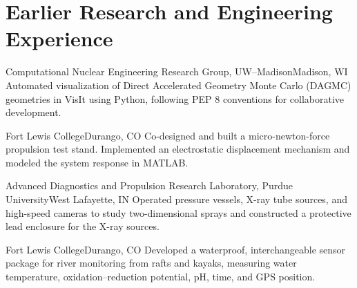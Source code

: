 \section{Earlier Research and Engineering Experience}
    {Computational Nuclear Engineering Research Group, UW--Madison}{Madison, WI}
Automated visualization of Direct Accelerated Geometry Monte Carlo (DAGMC) geometries in VisIt
using Python, following PEP 8 conventions for collaborative development.

    {Fort Lewis College}{Durango, CO}
Co-designed and built a micro-newton-force propulsion test stand. Implemented an electrostatic
displacement mechanism and modeled the system response in MATLAB.

    {Advanced Diagnostics and Propulsion Research Laboratory, Purdue University}{West Lafayette, IN}
Operated pressure vessels, X-ray tube sources, and high-speed cameras to study two-dimensional
sprays and constructed a protective lead enclosure for the X-ray sources.

    {Fort Lewis College}{Durango, CO}
Developed a waterproof, interchangeable sensor package for river monitoring from rafts and
kayaks, measuring water temperature, oxidation--reduction potential, pH, time, and GPS position.
